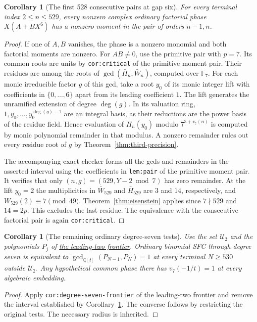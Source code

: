 \documentclass[11pt]{article}
\newtheorem{corollary}[theorem]{Corollary}
\begin{document}
\begin{corollary}[The first 528 consecutive pairs at gap six]
\label{cor:bounded-seven}
For every terminal index $2\le n\le529$, every nonzero complex
ordinary factorial phase $X(A+BX^6)$ has a nonzero moment in
the pair of orders $n-1,n$.
\end{corollary}
\begin{proof}
If one of $A,B$ vanishes, the phase is a nonzero monomial and
both factorial moments are nonzero. For $AB\ne0$, use the
primitive pair with $p=7$. Its common roots are units by \texttt{cor:critical} of
the primitive moment pair. Their residues are among the roots of
$\gcd(\bar H_n,\bar W_n)$, computed over $\mathbb F_7$.
For each monic irreducible factor $g$ of this gcd, take a root
$y_0$ of its monic integer lift with coefficients in $\{0,\ldots,6\}$
apart from its leading coefficient $1$.
The lift generates the unramified extension of degree $\deg(g)$.
In its valuation ring, $1,y_0,\ldots,y_0^{\deg(g)-1}$
are an integral basis, as their reductions are the power
basis of the residue field. Hence evaluation of $H_n(y_0)$
modulo $7^{3+v_7(n)}$ is computed by monic polynomial remainder
in that modulus. A nonzero remainder rules out every residue
root of $g$ by Theorem~\ref{thm:third-precision}.

The accompanying exact checker forms all the gcds and remainders
in the asserted interval using the coefficients in
\texttt{lem:pair} of the primitive moment pair. It verifies
that only $(n,g)=(529,Y-2\bmod7)$ has zero remainder.
At the lift $y_0=2$ the multiplicities in $\bar W_{529}$
and $\bar H_{529}$ are $3$ and $14$, respectively, and
$W_{529}(2)\equiv7\pmod{49}$. Theorem~\ref{thm:eisenstein}
applies since $7\nmid529$ and $14=2p$. This excludes the
last residue. The equivalence with the consecutive
factorial pair is again \texttt{cor:critical}.
\end{proof}

\begin{corollary}[The remaining ordinary degree-seven tests]
\label{cor:frontier}
Use the set $\mathcal U_2$ and the polynomials $P_j$ of
\href{GAP_SIX_TWO_DIGIT_LEADING_TWO_SFC.tex}{the leading-two frontier}.
Ordinary binomial SFC through degree seven is equivalent to
$\gcd_{\mathbb Q[t]}(P_{N-1},P_N)=1$ at every terminal
$N\ge530$ outside $\mathcal U_2$.
Any hypothetical common phase there has $v_7(-1/t)=1$
at every algebraic embedding.
\end{corollary}
\begin{proof}
Apply \texttt{cor:degree-seven-frontier} of the leading-two
frontier and remove the interval established by
Corollary~\ref{cor:bounded-seven}. The converse follows by
restricting the original tests. The necessary radius is inherited.
\end{proof}
\end{document}

